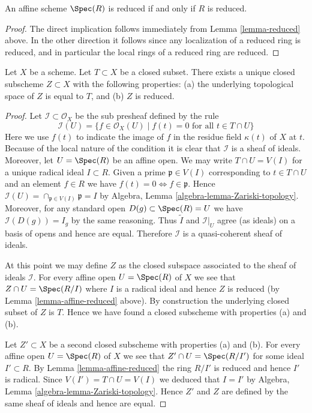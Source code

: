 \begin{lemma}
\label{lemma-affine-reduced}
An affine scheme $\Spec(R)$ is reduced
if and only if $R$ is reduced.
\end{lemma}

\begin{proof}
The direct implication follows immediately from
Lemma \ref{lemma-reduced} above.
In the other direction it follows since any localization of
a reduced ring is reduced, and in particular the local rings
of a reduced ring are reduced.
\end{proof}

\begin{lemma}
\label{lemma-reduced-closed-subscheme}
Let $X$ be a scheme. Let $T \subset X$ be a closed subset.
There exists a unique closed subscheme $Z \subset X$ with
the following properties: (a) the underlying topological
space of $Z$ is equal to $T$, and (b) $Z$ is reduced.
\end{lemma}

\begin{proof}
Let $\mathcal{I} \subset \mathcal{O}_X$ be the sub presheaf
defined by the rule
$$
\mathcal{I}(U) = \{f \in \mathcal{O}_X(U) \mid
f(t) = 0\text{ for all }t \in T\cap U\}
$$
Here we use $f(t)$ to indicate the image of
$f$ in the residue field $\kappa(t)$ of $X$ at $t$.
Because of the local nature of the condition it is
clear that $\mathcal{I}$ is a sheaf of ideals. Moreover,
let $U = \Spec(R)$ be an affine open.
We may write $T \cap U = V(I)$ for a unique radical
ideal $I \subset R$. Given a prime $\mathfrak p \in V(I)$
corresponding to $t \in T \cap U$ and an element $f \in R$ we have
$f(t) = 0 \Leftrightarrow f \in \mathfrak p$.
Hence $\mathcal{I}(U) = \cap_{\mathfrak p \in V(I)} \mathfrak p
= I$ by Algebra, Lemma \ref{algebra-lemma-Zariski-topology}.
Moreover, for any standard open $D(g) \subset \Spec(R) = U$
we have $\mathcal{I}(D(g)) = I_g$ by the same reasoning.
Thus $\widetilde I$ and $\mathcal{I}|_U$ agree (as ideals)
on a basis of opens and hence are equal. Therefore
$\mathcal{I}$ is a quasi-coherent sheaf of ideals.

\medskip\noindent
At this point we may define $Z$ as the closed subspace
associated to the sheaf of ideals $\mathcal{I}$. For every
affine open $U = \Spec(R)$ of $X$ we see that
$Z \cap U = \Spec(R/I)$ where $I$ is a radical ideal and
hence $Z$ is reduced (by Lemma \ref{lemma-affine-reduced} above).
By construction the underlying closed subset of $Z$ is $T$.
Hence we have found a closed subscheme with properties (a) and (b).

\medskip\noindent
Let $Z' \subset X$ be a second closed subscheme with properties (a) and (b).
For every affine open $U = \Spec(R)$ of $X$ we see that
$Z' \cap U = \Spec(R/I')$ for some ideal $I' \subset R$.
By Lemma \ref{lemma-affine-reduced} the ring $R/I'$ is
reduced and hence $I'$ is radical. Since $V(I') = T \cap U = V(I)$
we deduced that $I = I'$ by
Algebra, Lemma \ref{algebra-lemma-Zariski-topology}.
Hence $Z'$ and $Z$ are defined by the same sheaf of ideals
and hence are equal.
\end{proof}

